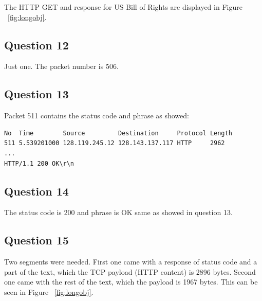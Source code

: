 \documentclass[titlepage, paper=a4, fontsize=11pt]{scrartcl} %
\numberwithin{equation}{section} %
\numberwithin{figure}{section} %
\numberwithin{table}{section} %
\begin{document}
The HTTP GET and response for US Bill of Rights are displayed in Figure ~\ref{fig:longobj}.
\\

\subsection*{Question 12}
Just one. The packet number is 506.
\\


\subsection*{Question 13}
Packet 511 contains the status code and phrase as showed:
\begin{verbatim}
No  Time        Source         Destination     Protocol Length
511	5.539201000	128.119.245.12 128.143.137.117 HTTP     2962
...
HTTP/1.1 200 OK\r\n
\end{verbatim}


\subsection*{Question 14}
The status code is 200 and phrase is OK same as showed in question 13.
\\


\subsection*{Question 15}
Two segments were needed. First one came with a response of status code and
a part of the text, which the TCP payload (HTTP content) is 2896 bytes.
Second one came with the rest of the text, which the payload is 1967 bytes.
This can be seen in Figure ~\ref{fig:longobj}.
\\
\end{document}
